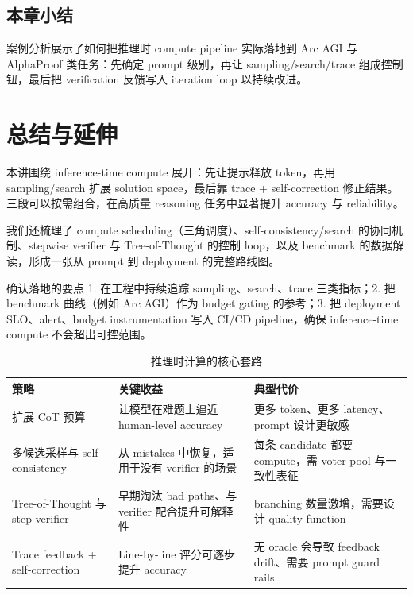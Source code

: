 \documentclass[a4paper]{article}
\begin{document}
\subsection{本章小结}
案例分析展示了如何把推理时 compute pipeline 实际落地到 Arc AGI 与 AlphaProof 类任务：先确定 prompt 级别，再让 sampling/search/trace 组成控制钮，最后把 verification 反馈写入 iteration loop 以持续改进。

\section{总结与延伸}
本讲围绕 inference-time compute 展开：先让提示释放 token，再用 sampling/search 扩展 solution space，最后靠 trace + self-correction 修正结果。三段可以按需组合，在高质量 reasoning 任务中显著提升 accuracy 与 reliability。

我们还梳理了 compute scheduling（三角调度）、self-consistency/search 的协同机制、stepwise verifier 与 Tree-of-Thought 的控制 loop，以及 benchmark 的数据解读，形成一张从 prompt 到 deployment 的完整路线图。

\begin{importantbox}{确认落地的要点}
1. 在工程中持续追踪 sampling、search、trace 三类指标；2. 把 benchmark 曲线（例如 Arc AGI）作为 budget gating 的参考；3. 把 deployment SLO、alert、budget instrumentation 写入 CI/CD pipeline，确保 inference-time compute 不会超出可控范围。
\end{importantbox}

\begin{table}[H]
\centering
\caption{推理时计算的核心套路}
\begin{tabular}{p{}p{}p{}}
\toprule
策略 & 关键收益 & 典型代价 \\
\midrule
扩展 CoT 预算 & 让模型在难题上逼近 human-level accuracy & 更多 token、更多 latency、prompt 设计更敏感 \\
多候选采样与 self-consistency & 从 mistakes 中恢复，适用于没有 verifier 的场景 & 每条 candidate 都要 compute，需 voter pool 与一致性表征 \\
Tree-of-Thought 与 step verifier & 早期淘汰 bad paths、与 verifier 配合提升可解释性 & branching 数量激增，需要设计 quality function \\
Trace feedback + self-correction & Line-by-line 评分可逐步提升 accuracy & 无 oracle 会导致 feedback drift、需要 prompt guard rails \\
\bottomrule
\end{tabular}
\end{table}
\end{document}
